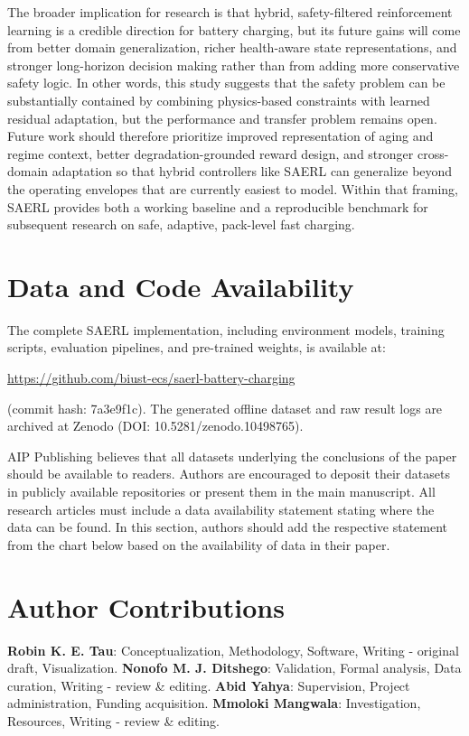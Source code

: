 \documentclass[%
 aip,
 amsmath,amssymb,
reprint, onecolumn %
]{revtex4-1}
\begin{document}
The broader implication for research is that hybrid, safety-filtered reinforcement learning is a credible direction for battery charging, but its future gains will come from better domain generalization, richer health-aware state representations, and stronger long-horizon decision making rather than from adding more conservative safety logic. In other words, this study suggests that the safety problem can be substantially contained by combining physics-based constraints with learned residual adaptation, but the performance and transfer problem remains open. Future work should therefore prioritize improved representation of aging and regime context, better degradation-grounded reward design, and stronger cross-domain adaptation so that hybrid controllers like SAERL can generalize beyond the operating envelopes that are currently easiest to model. Within that framing, SAERL provides both a working baseline and a reproducible benchmark for subsequent research on safe, adaptive, pack-level fast charging.


\section*{Data and Code Availability}
The complete SAERL implementation, including environment models, training scripts, evaluation pipelines, and pre-trained weights, is available at:
\begin{center}
\url{https://github.com/biust-ecs/saerl-battery-charging}
\end{center}
(commit hash: 7a3e9f1c). The generated offline dataset and raw result logs are archived at Zenodo (DOI: 10.5281/zenodo.10498765).


AIP Publishing believes that all datasets underlying the conclusions of the paper should be available to readers. Authors are encouraged to deposit their datasets in publicly available repositories or present them in the main manuscript. All research articles must include a data availability statement stating where the data can be found. In this section, authors should add the respective statement from the chart below based on the availability of data in their paper.


\section*{Author Contributions}
\textbf{Robin K. E. Tau}: Conceptualization, Methodology, Software, Writing - original draft, Visualization. \textbf{Nonofo M. J. Ditshego}: Validation, Formal analysis, Data curation, Writing - review \& editing. \textbf{Abid Yahya}: Supervision, Project administration, Funding acquisition. \textbf{Mmoloki Mangwala}: Investigation, Resources, Writing - review \& editing.
\end{document}
